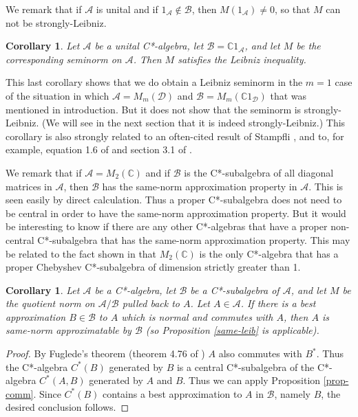 \documentclass[12pt]{amsart}
\newcommand{\<}{\langle}
\renewcommand{\>}{\rangle}
\newcommand{\cA}{{\mathcal A}}
\newcommand{\cB}{{\mathcal B}}
\newcommand{\cD}{{\mathcal D}}
\newcommand{\bC}{{\mathbb C}}
\newtheorem{corollary}[theorem]{Corollary}
\theoremstyle{definition}   %
\begin{document}
We remark that if $\cA$ is unital
and if $1_\cA \notin \cB$, then $M(1_\cA) \neq 0$,
so that $M$ can not be strongly-Leibniz.


\begin{corollary}
\label{identity}
Let $\cA$ be a unital C*-algebra, let $\cB = \bC 1_\cA$, and let $M$ be
the corresponding seminorm on $\cA$. Then $M$ satisfies the Leibniz
inequality.
\end{corollary}

This last corollary shows that we do obtain a Leibniz seminorm 
in the $m = 1$  case of the situation
in which $\cA = M_m(\cD)$ and $\cB = M_m(\bC 1_\cD)$
that was mentioned in introduction. But it does not show that
the seminorm is strongly-Leibniz. (We will see in the next section
that it is indeed strongly-Leibniz.)
This corollary is also strongly related to an often-cited result of Stampfli \cite{Stm},
and to, for example, equation 1.6 of \cite{BhS} and section 3.1
of \cite{ChL}.

We remark that if $\cA = M_2(\bC)$ and if $\cB$ is the C*-subalgebra of
all diagonal matrices in $\cA$, then $\cB$ has the same-norm approximation
property in $\cA$. This is seen easily by direct calculation. Thus a proper C*-subalgebra
does not need to be central in order to have the same-norm approximation property.
But it would be interesting to know if there are any other C*-algebras that
have a proper non-central C*-subalgebra that has the same-norm approximation
property. This may be related to the fact shown in \cite{Pd2} that $M_2(\bC)$
is the only C*-algebra that has a proper Chebyshev C*-subalgebra of dimension
strictly greater than 1.

\begin{corollary}
\label{normal}
Let $\cA$ be a C*-algebra, let $\cB$ be a C*-subalgebra
of $\cA$, and let $M$ be the quotient norm on $\cA/\cB$ pulled back to $A$.
Let $A\in \cA$. If there is a best approximation $B \in \cB$ to $A$ which is normal 
and commutes with $A$, then $A$ is same-norm approximatable by $\cB$
(so Proposition \ref{same-leib} is applicable).
\end{corollary}

\begin{proof}
By Fuglede's theorem (theorem 4.76 of \cite{Dgl}) $A$ also commutes
with $B^*$. Thus the C*-algebra $C^*(B)$ generated by $B$
is a central C*-subalgebra of the
C*-algebra $C^*(A, B)$ generated by
$A$ and $B$. Thus we can apply Proposition \ref{prop-comm}.
Since $C^*(B)$ contains a best approximation  to
$A$ in $\cB$, namely $B$, the desired conclusion follows.
\end{proof}
\end{document}

